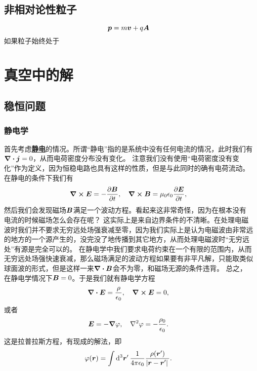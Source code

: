 \documentclass[UTF8, a4paper]{ctexart}
\newcommand*{\concept}[1]{\underline{\textbf{#1}}}
\begin{document}
\subsection{非相对论性粒子}

\begin{equation}
    \vb*{p} = m \vb*{v} + q \vb*{A}
\end{equation}
如果粒子始终处于

\section{真空中的解}

\subsection{稳恒问题}

\subsubsection{静电学}

首先考虑\concept{静电}的情况。所谓“静电”指的是系统中没有任何电流的情况，此时我们有$\div{\vb*{j}}=0$，从而电荷密度分布没有变化。
注意我们没有使用“电荷密度没有变化”作为定义，因为恒稳电路也具有这样的性质，但是与此同时的确有电荷流动。
在静电的条件下我们有
\[
    \curl{\vb*{E}} = - \pdv{\vb*{B}}{t}, \quad \curl{\vb*{B}} = \mu_0 \epsilon_0 \pdv{\vb*{E}}{t},
\]
然后我们会发现磁场$\vb*{B}$满足一个波动方程。看起来这非常奇怪，因为在根本没有电流的时候磁场怎么会存在呢？
这实际上是来自边界条件的不清晰。在处理电磁波时我们并不要求无穷远处场强衰减至零，因为我们实际上是认为电磁波由非常远的地方的一个源产生的，没完没了地传播到其它地方，从而处理电磁波时“无穷远处”有源是完全可以的。
在静电学中我们要求电荷约束在一个有限的范围内，从而无穷远处场强快速衰减，那么磁场满足的波动方程如果要有非平凡解，只能取类似球面波的形式，但是这样一来$\div{\vb*{B}}$会不为零，和磁场无源的条件违背。
总之，在静电学情况下$\vb*{B}=0$。于是我们就有静电学方程
\begin{equation}
    \div{\vb*{E}} = \frac{\rho}{\epsilon_0}, \quad \curl{\vb*{E}} = 0,
    \label{eq:static-e-field}
\end{equation}
或者
\begin{equation}
    \vb*{E} = - \grad{\varphi}, \quad \laplacian{\varphi} = - \frac{\rho_0}{\epsilon_0}.
    \label{eq:static-phi-field}
\end{equation}
这是拉普拉斯方程，有现成的解法，即
\begin{equation}
    \varphi(\vb*{r}) = \int \dd[3]{\vb*{r}'} \frac{1}{4\pi \epsilon_0} \frac{\rho(\vb*{r}')}{\abs*{\vb*{r} - \vb*{r}'}}.
    \label{eq:from-q-to-phi}
\end{equation}
\end{document}
